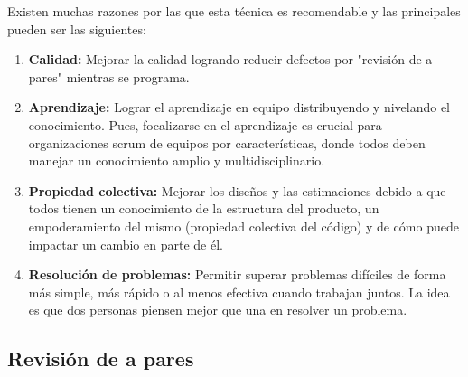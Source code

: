 Existen muchas razones por las que esta técnica es recomendable y las principales pueden ser las siguientes:

\begin{enumerate}

\item \textbf{Calidad:} Mejorar la calidad logrando reducir defectos por "revisión de a pares" mientras se programa.

\item \textbf{Aprendizaje:} Lograr el aprendizaje en equipo distribuyendo y nivelando el conocimiento. Pues, focalizarse en el aprendizaje es crucial para organizaciones scrum de equipos por características, donde todos deben manejar un conocimiento amplio y multidisciplinario. 

\item \textbf{Propiedad colectiva:}
Mejorar los diseños y las estimaciones debido a que todos tienen un conocimiento de la estructura del producto, un empoderamiento del mismo (propiedad colectiva del código) y de cómo puede impactar un cambio en parte de él.

\item \textbf{Resolución de problemas:} Permitir superar problemas difíciles de forma más simple, más rápido o al menos efectiva cuando trabajan juntos. La idea es que dos personas piensen mejor que una en resolver un problema.

\end{enumerate}

\subsection{Revisión de a pares}

